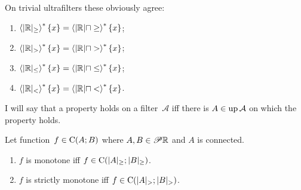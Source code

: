 \begin{rem}
On trivial ultrafilters these obviously agree:
\begin{enumerate}
\item $\left\langle |\mathbb{R}|_{\geq}\right\rangle ^{\ast}\{x\} = \left\langle |\mathbb{R}| \sqcap \geq\right\rangle ^{\ast}\{x\}$;
\item $\left\langle |\mathbb{R}|_{>}\right\rangle ^{\ast}\{x\} = \left\langle |\mathbb{R}| \sqcap >\right\rangle ^{\ast}\{x\}$;
\item $\left\langle |\mathbb{R}|_{\leq}\right\rangle ^{\ast}\{x\} = \left\langle |\mathbb{R}| \sqcap \leq\right\rangle ^{\ast}\{x\}$;
\item $\left\langle |\mathbb{R}|_{<}\right\rangle ^{\ast}\{x\} = \left\langle |\mathbb{R}| \sqcap <\right\rangle ^{\ast}\{x\}$.
\end{enumerate}
\end{rem}

I will say that a property holds on a filter~$\mathcal{A}$ iff there is $A\in\operatorname{up}\mathcal{A}$ on which the property holds.


\begin{lem}
Let function~$f\in\mathrm{C}(A;B)$ where $A,B\in\mathscr{P}\mathbb{R}$ and $A$ is connected.
\begin{enumerate}
\item $f$ is monotone iff $f\in\mathrm{C}(|A|_{\geq};|B|_{\geq})$.
\item $f$ is strictly monotone iff $f\in\mathrm{C}(|A|_{>};|B|_{>})$.
\end{enumerate}
\end{lem}

